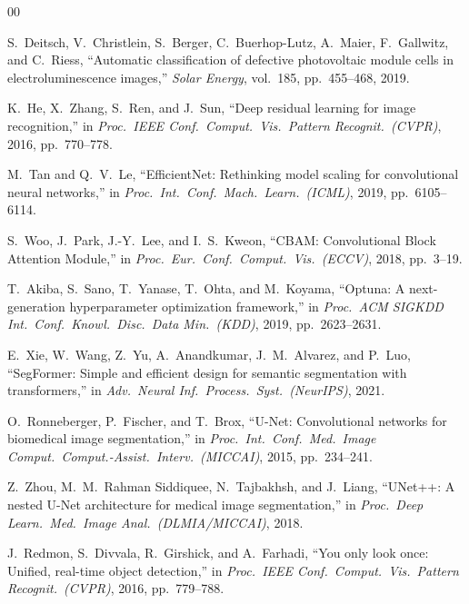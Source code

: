 \documentclass[conference]{IEEEtran}
\begin{document}
\begin{thebibliography}{00}

S.\ Deitsch, V.\ Christlein, S.\ Berger, C.\ Buerhop-Lutz,
A.\ Maier, F.\ Gallwitz, and C.\ Riess,
``Automatic classification of defective photovoltaic module
cells in electroluminescence images,''
\textit{Solar Energy}, vol.~185, pp.~455--468, 2019.

K.\ He, X.\ Zhang, S.\ Ren, and J.\ Sun,
``Deep residual learning for image recognition,''
in \textit{Proc.\ IEEE Conf.\ Comput.\ Vis.\ Pattern
Recognit.\ (CVPR)}, 2016, pp.~770--778.

M.\ Tan and Q.\ V.\ Le,
``EfficientNet: Rethinking model scaling for convolutional
neural networks,''
in \textit{Proc.\ Int.\ Conf.\ Mach.\ Learn.\ (ICML)},
2019, pp.~6105--6114.

S.\ Woo, J.\ Park, J.-Y.\ Lee, and I.\ S.\ Kweon,
``CBAM: Convolutional Block Attention Module,''
in \textit{Proc.\ Eur.\ Conf.\ Comput.\ Vis.\ (ECCV)},
2018, pp.~3--19.

T.\ Akiba, S.\ Sano, T.\ Yanase, T.\ Ohta, and M.\ Koyama,
``Optuna: A next-generation hyperparameter optimization
framework,''
in \textit{Proc.\ ACM SIGKDD Int.\ Conf.\ Knowl.\ Disc.\
Data Min.\ (KDD)}, 2019, pp.~2623--2631.

E.\ Xie, W.\ Wang, Z.\ Yu, A.\ Anandkumar, J.\ M.\ Alvarez,
and P.\ Luo,
``SegFormer: Simple and efficient design for semantic
segmentation with transformers,''
in \textit{Adv.\ Neural Inf.\ Process.\ Syst.\ (NeurIPS)},
2021.

O.\ Ronneberger, P.\ Fischer, and T.\ Brox,
``U-Net: Convolutional networks for biomedical image
segmentation,''
in \textit{Proc.\ Int.\ Conf.\ Med.\ Image Comput.\
Comput.-Assist.\ Interv.\ (MICCAI)}, 2015, pp.~234--241.

Z.\ Zhou, M.\ M.\ Rahman Siddiquee, N.\ Tajbakhsh, and
J.\ Liang,
``UNet++: A nested U-Net architecture for medical image
segmentation,''
in \textit{Proc.\ Deep Learn.\ Med.\ Image Anal.\
(DLMIA/MICCAI)}, 2018.

\bibitem{redmon2016}
J.\ Redmon, S.\ Divvala, R.\ Girshick, and A.\ Farhadi,
``You only look once: Unified, real-time object detection,''
in \textit{Proc.\ IEEE Conf.\ Comput.\ Vis.\ Pattern
Recognit.\ (CVPR)}, 2016, pp.~779--788.


\end{thebibliography}
\end{document}
